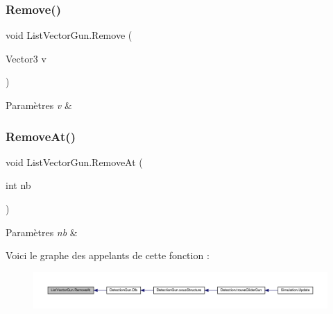 \subsubsection{\texorpdfstring{Remove()}{Remove()}}
{\footnotesize\ttfamily void List\+Vector\+Gun.\+Remove (\begin{DoxyParamCaption}\item[{Vector3}]{v }\end{DoxyParamCaption})\hspace{0.3cm}{\ttfamily [inline]}}






\begin{DoxyParams}{Paramètres}
{\em v} & \\
\hline
\end{DoxyParams}
\mbox{\label{class_list_vector_gun_a1ffc9f3c2ac48631dcd05ba8061ba9c7}} 
\subsubsection{\texorpdfstring{Remove\+At()}{RemoveAt()}}
{\footnotesize\ttfamily void List\+Vector\+Gun.\+Remove\+At (\begin{DoxyParamCaption}\item[{int}]{nb }\end{DoxyParamCaption})\hspace{0.3cm}{\ttfamily [inline]}}






\begin{DoxyParams}{Paramètres}
{\em nb} & \\
\hline
\end{DoxyParams}
Voici le graphe des appelants de cette fonction \+:
\nopagebreak
\begin{figure}[H]
\begin{center}
\leavevmode
\includegraphics[width=350pt]{class_list_vector_gun_a1ffc9f3c2ac48631dcd05ba8061ba9c7_icgraph}
\end{center}
\end{figure}
\mbox{\label{class_list_vector_gun_a81d2c8a06d61648f274eb644901f1959}} 
